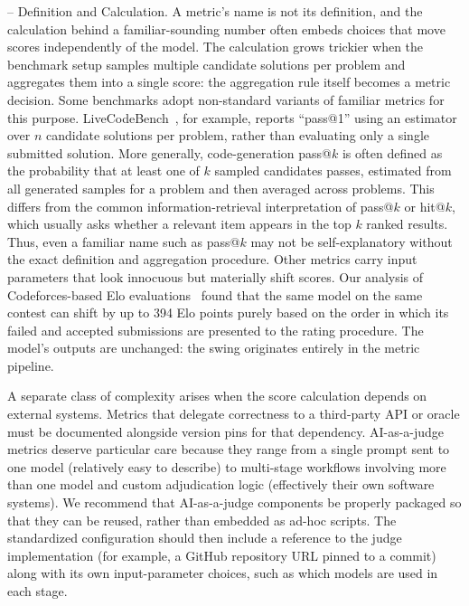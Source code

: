 \documentclass{IEEEcsmag}
\begin{document}
\smallskip \noindent -- Definition and Calculation. A metric's name is not its definition, and the calculation behind a familiar-sounding number often embeds choices that move scores independently of the model. The calculation grows trickier when the benchmark setup samples multiple candidate solutions per problem and aggregates them into a single score: the aggregation rule itself becomes a metric decision. Some benchmarks adopt non-standard variants of familiar metrics for this purpose. LiveCodeBench~\cite{jain2024livecodebench}, for example, reports ``pass@1'' using an estimator over $n$ candidate solutions per problem, rather than evaluating only a single submitted solution. More generally, code-generation pass@$k$ is often defined as the probability that at least one of $k$ sampled candidates passes, estimated from all generated samples for a problem and then averaged across problems. This differs from the common information-retrieval interpretation of pass@$k$ or hit@$k$, which usually asks whether a relevant item appears in the top $k$ ranked results. Thus, even a familiar name such as pass@$k$ may not be self-explanatory without the exact definition and aggregation procedure. Other metrics carry input parameters that look innocuous but materially shift scores. Our analysis of Codeforces-based Elo evaluations~\cite{zheng2026elo} found that the same model on the same contest can shift by up to 394 Elo points purely based on the order in which its failed and accepted submissions are presented to the rating procedure. The model's outputs are unchanged: the swing originates entirely in the metric pipeline.

A separate class of complexity arises when the score calculation depends on external systems. Metrics that delegate correctness to a third-party API or oracle must be documented alongside version pins for that dependency. AI-as-a-judge metrics deserve particular care because they range from a single prompt sent to one model (relatively easy to describe) to multi-stage workflows involving more than one model and custom adjudication logic (effectively their own software systems). We recommend that AI-as-a-judge components be properly packaged so that they can be reused, rather than embedded as ad-hoc scripts. The standardized configuration should then include a reference to the judge implementation (for example, a GitHub repository URL pinned to a commit) along with its own input-parameter choices, such as which models are used in each stage.
\end{document}
